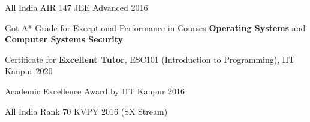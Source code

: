 \begin{cvhonors}

  \cvhonor
  {\ifdefined \ONEPAGE \else All India \fi AIR 147}
  {JEE Advanced 2016}
  {}

  

  \cvhonor
  {Got A* Grade for Exceptional Performance in Courses}
  {\textbf{Operating Systems} and \textbf{Computer Systems Security}}{}

  \cvhonor
  {Certificate for \textbf{Excellent Tutor}, ESC101 (Introduction to Programming), IIT Kanpur}
  {2020}{}

  \cvhonor
  {Academic Excellence Award by IIT Kanpur}
  {2016}{}

  \cvhonor
  {All India Rank 70}
  {KVPY 2016 (SX Stream)}{}

\end{cvhonors}


